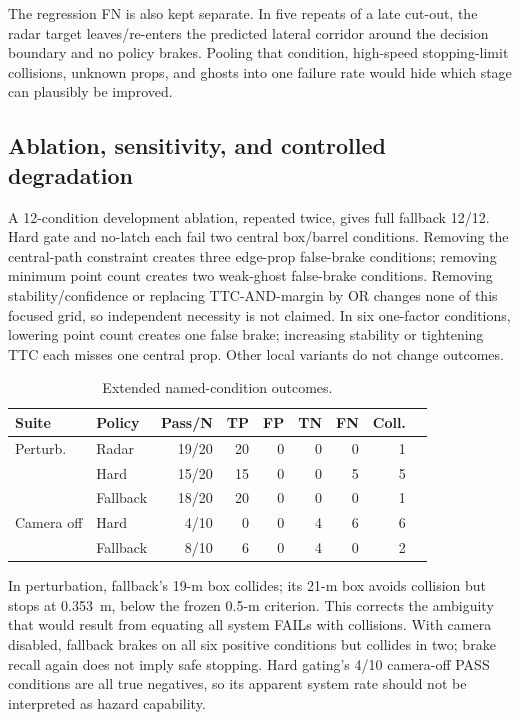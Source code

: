 \documentclass[conference]{IEEEtran}
\begin{document}
The regression FN is also kept separate. In five repeats of a late cut-out, the
radar target leaves/re-enters the predicted lateral corridor around the decision
boundary and no policy brakes. Pooling that condition, high-speed stopping-limit
collisions, unknown props, and ghosts into one failure rate would hide which
stage can plausibly be improved.

\subsection{Ablation, sensitivity, and controlled degradation}
A 12-condition development ablation, repeated twice, gives full fallback 12/12.
Hard gate and no-latch each fail two central box/barrel conditions. Removing the
central-path constraint creates three edge-prop false-brake conditions; removing
minimum point count creates two weak-ghost false-brake conditions. Removing
stability/confidence or replacing TTC-AND-margin by OR changes none of this
focused grid, so independent necessity is not claimed. In six one-factor
conditions, lowering point count creates one false brake; increasing stability
or tightening TTC each misses one central prop. Other local variants do not
change outcomes.

\begin{table}[t]
\caption{Extended named-condition outcomes.}
\label{tab:extended}
\centering\scriptsize
\setlength{\tabcolsep}{3pt}
\begin{tabular}{llrrrrrrr}
\toprule Suite & Policy & Pass/N & TP & FP & TN & FN & Coll.\\ \midrule
Perturb. & Radar & 19/20 & 20 & 0 & 0 & 0 & 1\\
 & Hard & 15/20 & 15 & 0 & 0 & 5 & 5\\
 & Fallback & 18/20 & 20 & 0 & 0 & 0 & 1\\
\midrule
Camera off & Hard & 4/10 & 0 & 0 & 4 & 6 & 6\\
 & Fallback & 8/10 & 6 & 0 & 4 & 0 & 2\\
\bottomrule
\end{tabular}
\end{table}

In perturbation, fallback's 19-m box collides; its 21-m box avoids collision but
stops at 0.353~m, below the frozen 0.5-m criterion. This corrects the ambiguity
that would result from equating all system FAILs with collisions. With camera
disabled, fallback brakes on all six positive conditions but collides in two;
brake recall again does not imply safe stopping. Hard gating's 4/10 camera-off
PASS conditions are all true negatives, so its apparent system rate should not
be interpreted as hazard capability.
\end{document}
